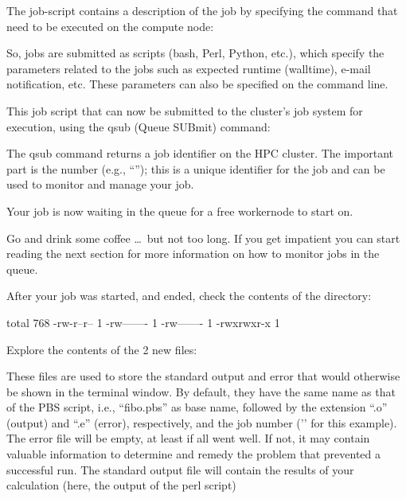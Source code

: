 The job-script contains a description of the job by specifying the command that
need to be executed on the compute node:


So, jobs are submitted as scripts (bash, Perl, Python, etc.), which specify the
parameters related to the jobs such as expected runtime (walltime), e-mail
notification, etc. These parameters can also be specified on the command line.

This job script that can now be submitted to the cluster's job system for
execution, using the qsub (Queue SUBmit) command:

\begin{prompt}
\end{prompt}

The qsub command returns a job identifier on the HPC cluster. The important
part is the number (e.g., ``\jobnumber''); this is a unique identifier for the job
and can be used to monitor and manage your job.

Your job is now waiting in the queue for a free workernode to start on.

Go and drink some coffee \dots\ but not too long. If you get impatient you can
start reading the next section for more information on how to monitor jobs in the queue.

After your job was started, and ended, check the contents of the directory:

\begin{prompt}
total 768
-rw-r--r-- 1 %
-rw------- 1 %
-rw------- 1 %
-rwxrwxr-x 1 %
\end{prompt}

Explore the contents of the 2 new files:

\begin{prompt}
\end{prompt}

These files are used to store the standard output and error that would
otherwise be shown in the terminal window. By default, they have the same name
as that of the PBS script, i.e., ``fibo.pbs'' as base name, followed by the
extension ``.o'' (output) and ``.e'' (error), respectively, and the job number
('\jobnumber' for this example). The error file will be empty, at least if all went
well. If not, it may contain valuable information to determine and remedy the
problem that prevented a successful run. The standard output file will contain
the results of your calculation (here, the output of the perl script)

